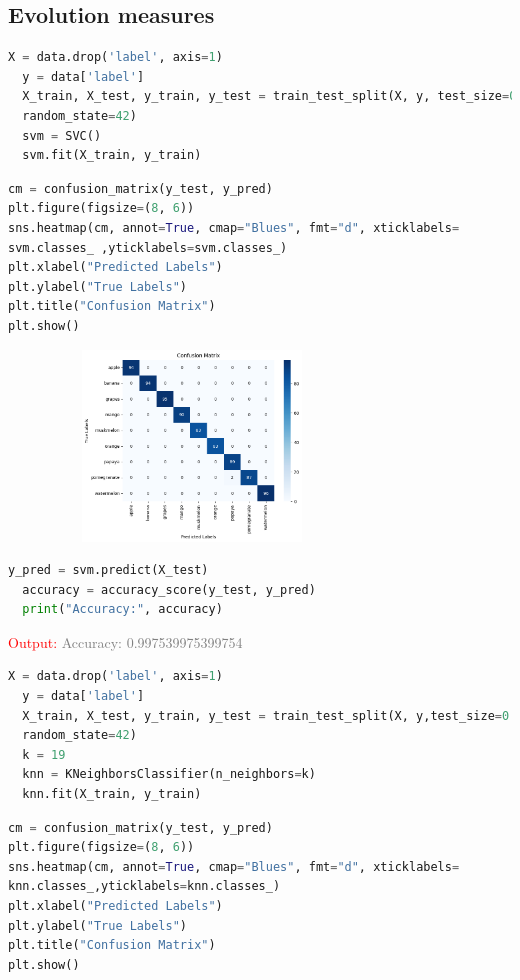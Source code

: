 \subsection*{Evolution measures}

\textcolor{green}{\hspace{0.5cm}{Using Support Vector Machine(SVM) Algorithm:}}
\begin{lstlisting}[language=Python]
  X = data.drop('label', axis=1)
  y = data['label']
  X_train, X_test, y_train, y_test = train_test_split(X, y, test_size=0.3, 
  random_state=42)
  svm = SVC()
  svm.fit(X_train, y_train)
\end{lstlisting}
\begin{lstlisting}[language=Python]
cm = confusion_matrix(y_test, y_pred)
plt.figure(figsize=(8, 6))
sns.heatmap(cm, annot=True, cmap="Blues", fmt="d", xticklabels=
svm.classes_ ,yticklabels=svm.classes_)
plt.xlabel("Predicted Labels")
plt.ylabel("True Labels")
plt.title("Confusion Matrix")
plt.show()
\end{lstlisting}

\begin{figure}[h]
\centering
 \footnotesize
 \includegraphics[width=3in,height=2in]{confusion.png}
\label{fig:dunnhalftone}
\end{figure}

\begin{lstlisting}[language=Python]
  y_pred = svm.predict(X_test)
  accuracy = accuracy_score(y_test, y_pred)
  print("Accuracy:", accuracy)
\end{lstlisting}
\hspace{2in}\textcolor{red}{Output:}
\newline
\hspace{2in}\textcolor{grey}{Accuracy: 0.997539975399754}

\textcolor{green}{\hspace{0.5cm}{Using K-Nearest Neighbour(KNN)  Algorithm:}}
\begin{lstlisting}[language=Python]
  X = data.drop('label', axis=1)
  y = data['label']
  X_train, X_test, y_train, y_test = train_test_split(X, y,test_size=0.3, 
  random_state=42)
  k = 19 
  knn = KNeighborsClassifier(n_neighbors=k)
  knn.fit(X_train, y_train)
\end{lstlisting}
\begin{lstlisting}[language=Python]
cm = confusion_matrix(y_test, y_pred)
plt.figure(figsize=(8, 6))
sns.heatmap(cm, annot=True, cmap="Blues", fmt="d", xticklabels=
knn.classes_,yticklabels=knn.classes_)
plt.xlabel("Predicted Labels")
plt.ylabel("True Labels")
plt.title("Confusion Matrix")
plt.show()
\end{lstlisting}

